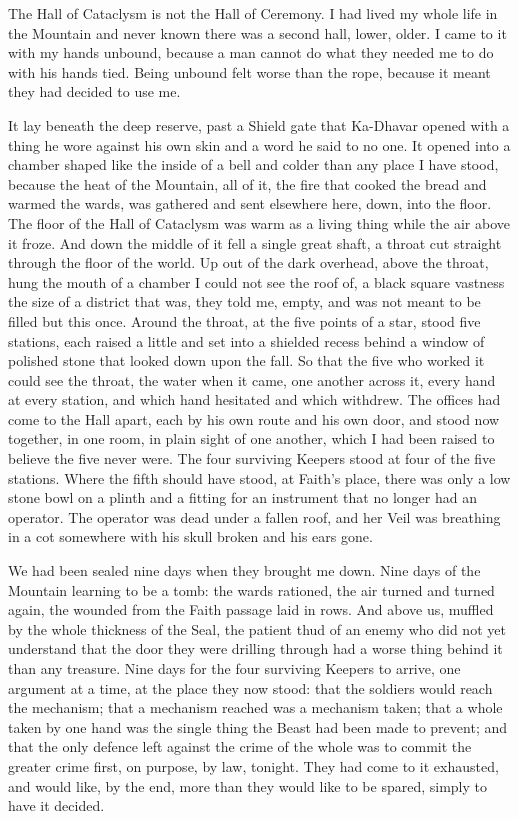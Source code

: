 
The Hall of Cataclysm is not the Hall of Ceremony. I had lived my whole life in the Mountain and never known there was a second hall, lower, older. I came to it with my hands unbound, because a man cannot do what they needed me to do with his hands tied. Being unbound felt worse than the rope, because it meant they had decided to use me.\par

It lay beneath the deep reserve, past a Shield gate that Ka-Dhavar opened with a thing he wore against his own skin and a word he said to no one. It opened into a chamber shaped like the inside of a bell and colder than any place I have stood, because the heat of the Mountain, all of it, the fire that cooked the bread and warmed the wards, was gathered and sent elsewhere here, down, into the floor. The floor of the Hall of Cataclysm was warm as a living thing while the air above it froze. And down the middle of it fell a single great shaft, a throat cut straight through the floor of the world. Up out of the dark overhead, above the throat, hung the mouth of a chamber I could not see the roof of, a black square vastness the size of a district that was, they told me, empty, and was not meant to be filled but this once. Around the throat, at the five points of a star, stood five stations, each raised a little and set into a shielded recess behind a window of polished stone that looked down upon the fall. So that the five who worked it could see the throat, the water when it came, one another across it, every hand at every station, and which hand hesitated and which withdrew. The offices had come to the Hall apart, each by his own route and his own door, and stood now together, in one room, in plain sight of one another, which I had been raised to believe the five never were. The four surviving Keepers stood at four of the five stations. Where the fifth should have stood, at Faith's place, there was only a low stone bowl on a plinth and a fitting for an instrument that no longer had an operator. The operator was dead under a fallen roof, and her Veil was breathing in a cot somewhere with his skull broken and his ears gone.\par

We had been sealed nine days when they brought me down. Nine days of the Mountain learning to be a tomb: the wards rationed, the air turned and turned again, the wounded from the Faith passage laid in rows. And above us, muffled by the whole thickness of the Seal, the patient thud of an enemy who did not yet understand that the door they were drilling through had a worse thing behind it than any treasure. Nine days for the four surviving Keepers to arrive, one argument at a time, at the place they now stood: that the soldiers would reach the mechanism; that a mechanism reached was a mechanism taken; that a whole taken by one hand was the single thing the Beast had been made to prevent; and that the only defence left against the crime of the whole was to commit the greater crime first, on purpose, by law, tonight. They had come to it exhausted, and would like, by the end, more than they would like to be spared, simply to have it decided.\par

